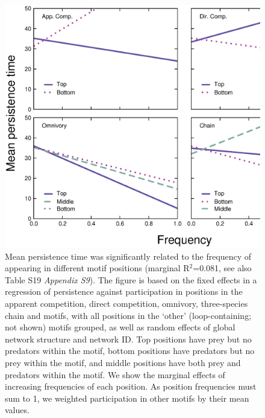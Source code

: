 \documentclass[12pt]{article}
\begin{document}
    \begin{figure}[ht!]
        \centering
        \includegraphics[width=\textwidth]{figures/roles/persistence_vs_positions_freq.eps}
        \caption{Mean persistence time was significantly related to the frequency of appearing in different motif positions (marginal R$^2$=0.081, see also Table S19 \emph{Appendix S9}). The figure is based on the fixed effects in a regression of persistence against participation in positions in the apparent competition, direct competition, omnivory, three-species chain and motifs, with all positions in the `other' (loop-containing; not shown) motifs grouped, as well as random effects of global network structure and network ID. Top positions have prey but no predators within the motif, bottom positions have predators but no prey within the motif, and middle positions have both prey and predators within the motif. We show the marginal effects of increasing frequencies of each position. As position frequencies must sum to 1, we weighted participation in other motifs by their mean values.}
        \label{fig:persistence_positions}
    \end{figure}

    \clearpage
\end{document}

